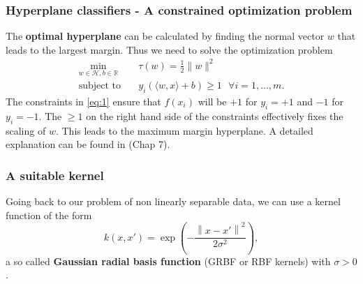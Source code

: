 \documentclass[aspectratio=169]{beamer}
\begin{document}
\begin{frame}{}
    \frametitle{Hyperplane classifiers - A constrained optimization problem}
    The \textbf{optimal hyperplane} can be calculated by finding the normal vector $w$ that leads to the largest margin. Thus we need to solve the optimization problem
    \begin{equation} \label{eq:1}
        \begin{aligned}
            \min_{w \in \mathcal{H}, b \in \mathbb{R}} \quad & \tau (w) = \frac{1}{2} \lVert w \rVert^2 \\
            \textrm{subject to} \quad & y_{i} \left( \langle w,x \rangle + b \right) \geq 1 \text{ } \forall i = {1, \dots, m}. 
        \end{aligned}
    \end{equation}
    The constraints in \eqref{eq:1} ensure that $f(x_i)$ will be $+1$ for $y_i = +1$ and $-1$ for  $y_i = -1$. The $\geq 1$ on the right hand side of the constraints effectively fixes the scaling of $w$. This leads to the maximum margin hyperplane. A detailed explanation can be found in \cite{Schoelkopf}(Chap 7).
\end{frame}


\begin{frame}{}
	\frametitle{A suitable kernel}
	Going back to our problem of non linearly separable data, we can use a kernel function of the form
    \begin{equation}
        k(x, x') = \exp \left( - \frac{\left\lVert x - x' \right\rVert^2}{2 \sigma^2} \right),
    \end{equation}
    a so called \textbf{Gaussian radial basis function} (GRBF or RBF kernels) with $ \sigma > 0$.
\end{frame}


\end{document}
